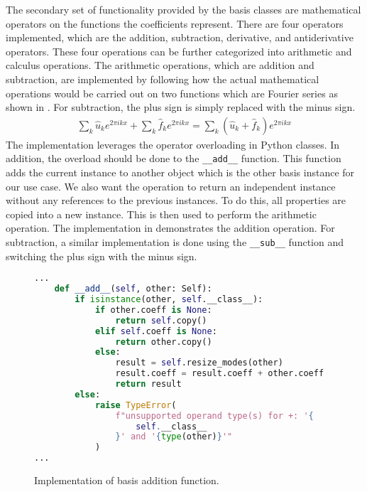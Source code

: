The secondary set of functionality provided by the basis classes are mathematical operators on the functions the coefficients represent. There are four operators implemented, which are the addition, subtraction, derivative, and antiderivative operators. These four operations can be further categorized into arithmetic and calculus operations. The arithmetic operations, which are addition and subtraction, are implemented by following how the actual mathematical operations would be carried out on two functions which are Fourier series as shown in . For subtraction, the plus sign is simply replaced with the minus sign.
\begin{align}
  \sum_{k} \hat{u}_k e^{2\pi ikx} + \sum_{k} \hat{f}_k e^{2\pi ikx} =
  \sum_{k} \left(\hat{u}_k + \hat{f}_k\right) e^{2\pi ikx} \label{eq:fourier_series_addition}
\end{align}
The implementation leverages the operator overloading in Python classes. In addition, the overload should be done to the \verb|__add__| function. This function adds the current instance to another object which is the other basis instance for our use case. We also want the operation to return an independent instance without any references to the previous instances. To do this, all properties are copied into a new instance. This is then used to perform the arithmetic operation. The implementation in  demonstrates the addition operation. For subtraction, a similar implementation is done using the \verb|__sub__| function and switching the plus sign with the minus sign.

\begin{figure}[H]
  \centering
  \begin{lstlisting}[language=Python]
...
    def __add__(self, other: Self):
        if isinstance(other, self.__class__):
            if other.coeff is None:
                return self.copy()
            elif self.coeff is None:
                return other.copy()
            else:
                result = self.resize_modes(other)
                result.coeff = result.coeff + other.coeff
                return result
        else:
            raise TypeError(
                f"unsupported operand type(s) for +: '{
                    self.__class__
                }' and '{type(other)}'"
            )
...
  \end{lstlisting}
  \caption{Implementation of basis addition function.}\label{fig:basis_addition_impl}
\end{figure}

